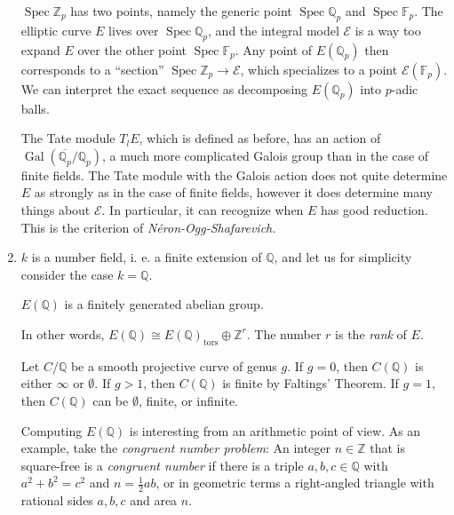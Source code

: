 \begin{enumerate}
  \( \operatorname{Spec} \mathbb{Z}_p \) has two points, namely the generic point \( \operatorname{Spec} \mathbb{Q}_p \) and \( \operatorname{Spec} \mathbb{F}_p \).
  The elliptic curve \( E \) lives over \( \operatorname{Spec} \mathbb{Q}_p \), and the integral model \( \mathcal{E} \) is a way too expand \( E \) over the other point \( \operatorname{Spec} \mathbb{F}_p \).
  Any point of \( E(\mathbb{Q}_p) \) then corresponds to a ``section'' \( \operatorname{Spec} \mathbb{Z}_p \to \mathcal{E} \), which specializes to a point \( \mathcal{E}(\mathbb{F}_p) \).
  We can interpret the exact sequence as decomposing \( E(\mathbb{Q}_p) \) into \( p \)-adic balls.

  The Tate module \( T_l E \), which is defined as before, has an action of \( \operatorname{Gal} \left( \overline{\mathbb{Q}_p}/ \mathbb{Q}_p \right) \), a much more complicated Galois group than in the case of finite fields.
  The Tate module with the Galois action does not quite determine \( E \) as strongly as in the case of finite fields, however it does determine many things about \( \mathcal{E} \).
  In particular, it can recognize when \( E \) has good reduction.
  This is the criterion of \textit{N\'eron-Ogg-Shafarevich.}
\item \( k \) is a number field, i. e. a finite extension of \( \mathbb{Q} \), and let us for simplicity consider the case \( k = \mathbb{Q} \).
  \begin{theorem}
    \( E(\mathbb{Q}) \) is a finitely generated abelian group.
  \end{theorem}
  In other words, \( E(\mathbb{Q}) \cong E(\mathbb{Q})_{\text{tors}} \oplus \mathbb{Z}^r \).
  The number \( r \) is the \textit{rank} of \( E \).
  \begin{remark}
    Let \( C/\mathbb{Q} \) be a smooth projective curve of genus \( g \). If \( g = 0 \), then \( C(\mathbb{Q}) \) is either \( \infty \) or \( \emptyset \). If \( g > 1 \), then \( C(\mathbb{Q}) \) is finite by Faltings' Theorem. If \( g = 1 \), then \( C(\mathbb{Q}) \) can be \( \emptyset \), finite, or infinite.
  \end{remark}
  Computing \( E(\mathbb{Q}) \) is interesting from an arithmetic point of view. As an example, take the \textit{congruent number problem}:
  An integer \( n \in \mathbb{Z} \) that is square-free is a \textit{congruent number} if there is a triple \( a,b,c \in \mathbb{Q} \) with \( a^2 + b^2 = c^2 \) and \( n = \frac{1}{2}ab \), or in geometric terms a right-angled triangle with rational sides \( a,b,c \) and area \( n \).

\end{enumerate}
